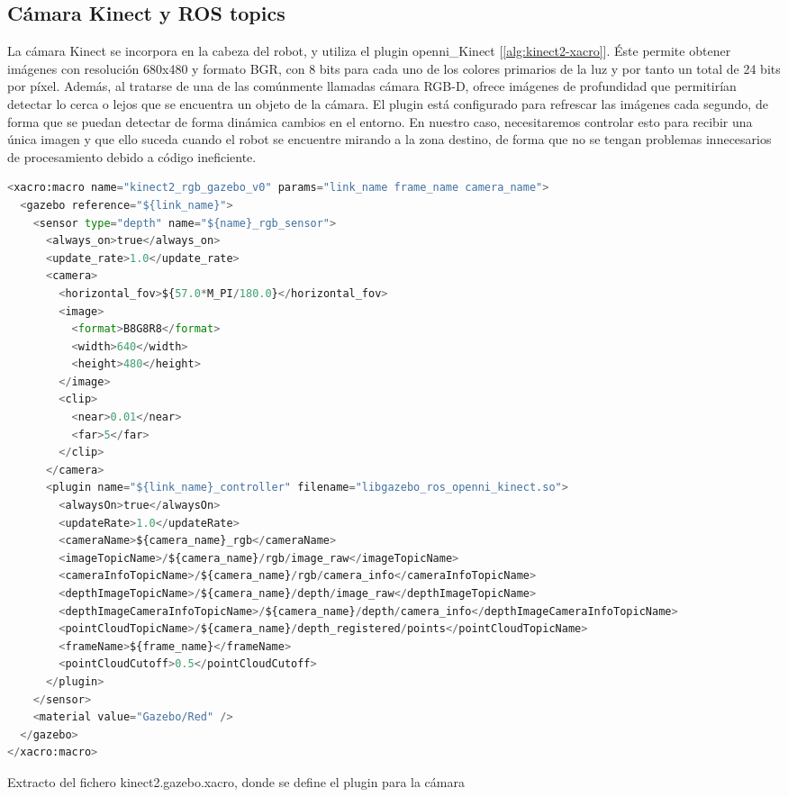 \documentclass[12pt,spanish,chapterprefix, numbers=noenddot]{book}
\numberwithin{equation}{section}
\numberwithin{figure}{section}
\begin{document}
\subsection{Cámara Kinect y ROS topics} 
La cámara Kinect se incorpora en la cabeza del robot, y utiliza el plugin openni\_Kinect [\ref{alg:kinect2-xacro}]. Éste permite obtener imágenes con resolución 680x480 y formato BGR, con 8 bits para cada uno de los colores primarios de la luz y por tanto un total de 24 bits por píxel. Además, al tratarse de una de las comúnmente llamadas cámara RGB-D, ofrece imágenes de profundidad que permitirían detectar lo cerca o lejos que se encuentra un objeto de la cámara. El plugin está configurado para refrescar las imágenes cada segundo, de forma que se puedan detectar de forma dinámica cambios en el entorno.
En nuestro caso, necesitaremos controlar esto para recibir una única imagen y que ello suceda cuando el robot se encuentre mirando a la zona destino, de forma que no se tengan problemas innecesarios de procesamiento debido a código ineficiente.

\vspace{20pt}
\begin{algorithm}[htb!]
	\begin{lstlisting}[breaklines=true,language=python]    
<xacro:macro name="kinect2_rgb_gazebo_v0" params="link_name frame_name camera_name">
  <gazebo reference="${link_name}">
    <sensor type="depth" name="${name}_rgb_sensor">
      <always_on>true</always_on>
      <update_rate>1.0</update_rate>
      <camera>
        <horizontal_fov>${57.0*M_PI/180.0}</horizontal_fov>
        <image>
          <format>B8G8R8</format>
          <width>640</width>
          <height>480</height>
        </image>
        <clip>
          <near>0.01</near>
          <far>5</far>
        </clip>
      </camera>
      <plugin name="${link_name}_controller" filename="libgazebo_ros_openni_kinect.so">
        <alwaysOn>true</alwaysOn>
        <updateRate>1.0</updateRate>
        <cameraName>${camera_name}_rgb</cameraName>
        <imageTopicName>/${camera_name}/rgb/image_raw</imageTopicName>
        <cameraInfoTopicName>/${camera_name}/rgb/camera_info</cameraInfoTopicName>
        <depthImageTopicName>/${camera_name}/depth/image_raw</depthImageTopicName>
        <depthImageCameraInfoTopicName>/${camera_name}/depth/camera_info</depthImageCameraInfoTopicName>
        <pointCloudTopicName>/${camera_name}/depth_registered/points</pointCloudTopicName>
        <frameName>${frame_name}</frameName>
        <pointCloudCutoff>0.5</pointCloudCutoff>
      </plugin>
    </sensor>
    <material value="Gazebo/Red" />
  </gazebo>
</xacro:macro>
	\end{lstlisting}
\caption{\label{alg:kinect2-xacro}Extracto del fichero kinect2.gazebo.xacro, donde se define el plugin para la cámara}
\end{algorithm}
\end{document}
